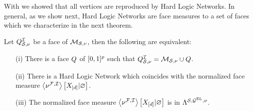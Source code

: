 
With  we showed that all vertices are reproduced by Hard Logic Networks.
In general, as we show next, Hard Logic Networks are face measures to a set of faces which we characterize in the next theorem.

\begin{theorem}\label{the:faceMeasureHardLogicNetworks}
    Let $Q^{\mathcal{I}}_{\mathcal{S},\nu}$ be a face of $\mathcal{M}_{\mathcal{S},\nu}$, then the following are equivalent:
    \begin{itemize}
        \item[(i)] There is a face $Q$ of $[0,1]^{p}$ such that $Q^{\mathcal{I}}_{\mathcal{S},\nu}=\mathcal{M}_{\mathcal{S},\nu}\cup Q$.
        \item[(ii)] There is a Hard Logic Network which coincides with the normalized face measure $\left\langle \nu^{\mathcal{F},\mathcal{I}}\right\rangle \left[ X_{[d]} | \varnothing \right]$.
        \item[(iii)] The normalized face measure $\left\langle \nu^{\mathcal{F},\mathcal{I}}\right\rangle \left[ X_{[d]} | \varnothing \right]$ is in $\Lambda^{\mathcal{S},\mathcal{G}^{\mathrm{EL}},\nu}$.
    \end{itemize}
\end{theorem}
